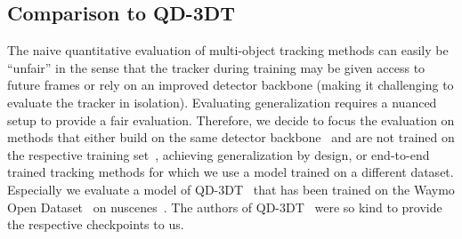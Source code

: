 \subsection{Comparison to QD-3DT} The naive quantitative evaluation of multi-object tracking methods can easily be ``unfair'' in the sense that the tracker during training may be given access to future frames or rely on an improved detector backbone (making it challenging to evaluate the tracker in isolation). Evaluating generalization requires a nuanced setup to provide a fair evaluation.
Therefore, we decide to focus the evaluation on methods that either build on the same detector backbone~\cite{zhou2019CenterPointVision} and are not trained on the respective training set~\cite{weng2020AB3DMOT}, achieving generalization by design, or end-to-end trained tracking methods for which we use a model trained on a different dataset. Especially we evaluate a model of QD-3DT~\cite{hu2021QD3DT} that has been trained on the Waymo Open Dataset~\cite{sun2020scalability} on nuscenes~\cite{caesar2020nuscenes}. The authors of QD-3DT~\cite{hu2021QD3DT} were so kind to provide the respective checkpoints to us.


